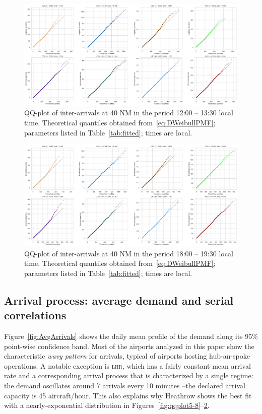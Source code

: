 \documentclass[final,review]{elsarticle}
\newcommand{\airp}[1]{\textcolor{#1}{\textsc{#1}}}
\begin{document}
\begin{figure}
    \includegraphics[width=\textwidth]{IA_qqplot1200-1330}
    \caption{QQ-plot of inter-arrivals at 40 NM in the period 12:00 -- 13:30 local time. Theoretical quantiles obtained from~\eqref{eq:DWeibullPMF}; parameters listed in Table~\ref{tab:fitted}; times are local.}
    \label{fig:qqplot5-11}
\end{figure}

\begin{figure}
    \includegraphics[width=\textwidth]{IA_qqplot1800-1930}
    \caption{QQ-plot of inter-arrivals at 40 NM in the period 18:00 -- 19:30 local time. Theoretical quantiles obtained from~\eqref{eq:DWeibullPMF}; parameters listed in Table~\ref{tab:fitted}; times are local.}
    \label{fig:qqplot5-17}
\end{figure}

\subsection{Arrival process: average demand and serial correlations}
\label{sec:serial_corr}

Figure~\ref{fig:AvgArrivals} shows the daily mean profile of the demand along its 95\% point-wise confidence band.
Most of the airports analyzed in this paper show the characteristic \emph{wavy pattern} for arrivals, typical of airports hosting hub-an-spoke operations.
A notable exception is \airp{lhr}, which has a fairly constant mean arrival rate and a corresponding arrival process that is characterized by a single regime: the demand oscillates around 7 arrivals every 10 minutes --the declared arrival capacity is 45 aircraft/hour.
This also explains why Heathrow shows the best fit with a nearly-exponential distribution in Figures~\ref{fig:qqplot5-8}--\ref{fig:qqplot5-17}.
\end{document}
